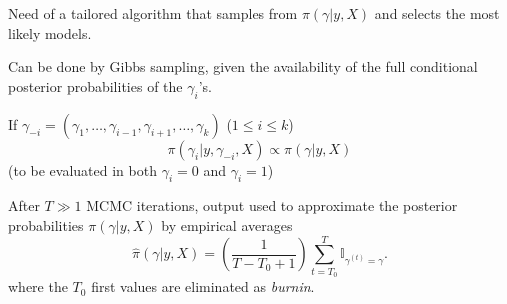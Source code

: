 \begin{slide}
\pause\vs
Need of a tailored algorithm 
that samples from $\pi(\gamma|y,X)$ and 
selects the most likely models. 

\vs Can be done by Gibbs sampling, given the availability 
of the full conditional posterior probabilities of the $\gamma_i$'s.

If $\gamma_{-i}=(\gamma_1,\ldots,\gamma_{i-1},\gamma_{i+1},\ldots,\gamma_k)$ 
($1\le i\le k$) 
$$
\pi(\gamma_i|y,\gamma_{-i},X)\propto
\pi(\gamma|y,X)
$$
(to be evaluated in both $\gamma_i=0$ and $\gamma_i=1$)

\end{slide}\begin{slide}

\colorbox{LightGrey}{}

\end{slide}\begin{slide}

After $T\gg 1$ MCMC iterations,
output used to approximate the posterior probabilities $\pi(\gamma|y,X)$ 
by empirical averages 
$$
\widehat{\pi}(\gamma|y,X)=\left(\frac{1}{T-T_0+1}\right)\sum_{t=T_0}^T \mathbb{I}_{\gamma^{(t)}=\gamma}.
$$
where the $T_0$ first values are eliminated as {\em burnin}.


\end{slide}
